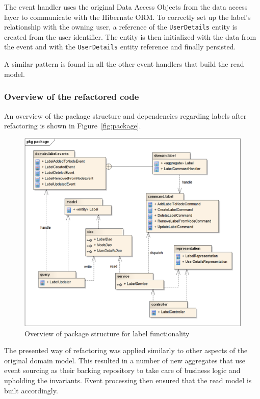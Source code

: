 \documentclass{book}
\begin{document}
The event handler uses the original Data Access Objects from the data
access layer to communicate with the Hibernate ORM. To correctly set up
the label's relationship with the owning user, a reference of the
\texttt{UserDetails} entity is created from the user identifier. The
entity is then initialized with the data from the event and with the
\texttt{UserDetails} entity reference and finally persisted.

A similar pattern is found in all the other event handlers that build
the read model.


\subsubsection{Overview of the refactored
code}\label{overview-of-the-refactored-code}

An overview of the package structure and dependencies regarding labels
after refactoring is shown in Figure~\ref{fig:package}.


\begin{figure}[h!]
\begin{center}
\includegraphics[width=0.98\columnwidth]{figures/package/package}
\caption{Overview of package structure for label functionality%
}
\end{center}
\end{figure}

The presented way of refactoring was applied similarly to other aspects
of the original domain model. This resulted in a number of new
aggregates that use event sourcing as their backing repository to take
care of business logic and upholding the invariants. Event processing
then ensured that the read model is built accordingly.
\end{document}
